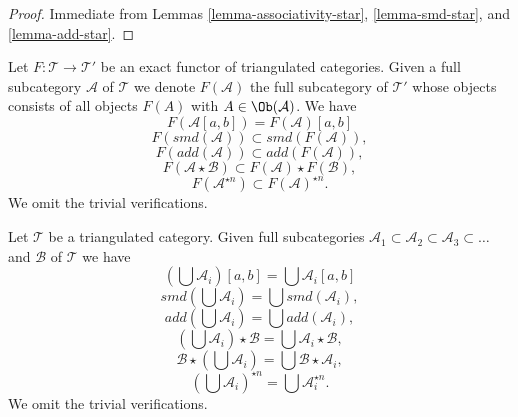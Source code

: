 \begin{proof}
Immediate from Lemmas \ref{lemma-associativity-star}, \ref{lemma-smd-star}, and
\ref{lemma-add-star}.
\end{proof}

\begin{remark}
\label{remark-operations-functor}
Let $F : \mathcal{T} \to \mathcal{T}'$ be an exact functor of triangulated
categories. Given a full subcategory $\mathcal{A}$ of $\mathcal{T}$ we denote
$F(\mathcal{A})$ the full subcategory of $\mathcal{T}'$ whose objects
consists of all objects $F(A)$ with $A \in \Ob(\mathcal{A})$. We have
$$
F(\mathcal{A}[a, b]) = F(\mathcal{A})[a, b]
$$
$$
F(smd(\mathcal{A})) \subset smd(F(\mathcal{A})),
$$
$$
F(add(\mathcal{A})) \subset add(F(\mathcal{A})),
$$
$$
F(\mathcal{A} \star \mathcal{B}) \subset F(\mathcal{A}) \star F(\mathcal{B}),
$$
$$
F(\mathcal{A}^{\star n}) \subset F(\mathcal{A})^{\star n}.
$$
We omit the trivial verifications.
\end{remark}

\begin{remark}
\label{remark-operations-unions}
Let $\mathcal{T}$ be a triangulated category. Given full subcategories
$\mathcal{A}_1 \subset \mathcal{A}_2 \subset \mathcal{A}_3 \subset \ldots$
and $\mathcal{B}$ of $\mathcal{T}$ we have
$$
\left(\bigcup \mathcal{A}_i\right)[a, b] = \bigcup \mathcal{A}_i[a, b]
$$
$$
smd\left(\bigcup \mathcal{A}_i\right) = \bigcup smd(\mathcal{A}_i),
$$
$$
add\left(\bigcup \mathcal{A}_i\right) = \bigcup add(\mathcal{A}_i),
$$
$$
\left(\bigcup \mathcal{A}_i\right) \star \mathcal{B} =
\bigcup \mathcal{A}_i \star \mathcal{B},
$$
$$
\mathcal{B} \star \left(\bigcup \mathcal{A}_i\right) =
\bigcup \mathcal{B} \star \mathcal{A}_i,
$$
$$
\left(\bigcup \mathcal{A}_i\right)^{\star n} =
\bigcup \mathcal{A}_i^{\star n}.
$$
We omit the trivial verifications.
\end{remark}

